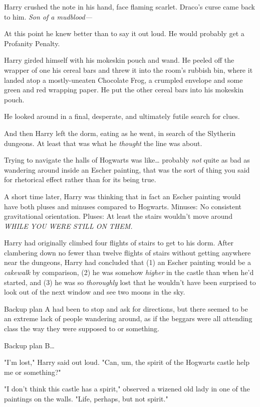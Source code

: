Harry crushed the note in his hand, face flaming scarlet. Draco's curse came
back to him. \emph{Son of a mudblood---}

At this point he knew better than to say it out loud. He would probably get a
Profanity Penalty.

Harry girded himself with his mokeskin pouch and wand. He peeled off the
wrapper of one his cereal bars and threw it into the room's rubbish bin, where
it landed atop a mostly-uneaten Chocolate Frog, a crumpled envelope and some
green and red wrapping paper. He put the other cereal bars into his mokeskin
pouch.

He looked around in a final, desperate, and ultimately futile search for clues.

And then Harry left the dorm, eating as he went, in search of the Slytherin
dungeons. At least that was what he \emph{thought} the line was about.

Trying to navigate the halls of Hogwarts was like{\ldots} probably \emph{not}
quite as bad as wandering around inside an Escher painting, that was the sort
of thing you said for rhetorical effect rather than for its being true.

A short time later, Harry was thinking that in fact an Escher painting would
have both pluses and minuses compared to Hogwarts. Minuses: No consistent
gravitational orientation. Pluses: At least the stairs wouldn't move
around \emph{WHILE YOU WERE STILL ON THEM.}

Harry had originally climbed four flights of stairs to get to his dorm. After
clambering down no fewer than twelve flights of stairs without getting anywhere
near the dungeons, Harry had concluded that (1) an Escher painting would be a
\emph{cakewalk} by comparison, (2) he was somehow \emph{higher} in the castle
than when he'd started, and (3) he was so \emph{thoroughly} lost that he
wouldn't have been surprised to look out of the next window and see two moons
in the sky.

Backup plan A had been to stop and ask for directions, but there seemed to be
an extreme lack of people wandering around, as if the beggars were all
attending class the way they were supposed to or something.

Backup plan B{\ldots}

"I'm lost," Harry said out loud. "Can, um, the spirit of the Hogwarts castle
help me or something?"

"I don't think this castle has a spirit," observed a wizened old lady in one of
the paintings on the walls. "Life, perhaps, but not spirit."

